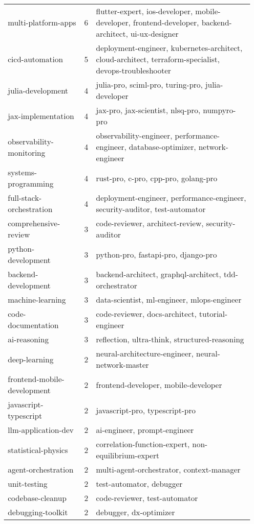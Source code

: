 \documentclass[11pt,a4paper]{article}
\begin{document}
\begin{longtable}{>{\ttfamily}p{} c >{\raggedright\arraybackslash}p{}}
multi-platform-apps & 6 & flutter-expert, ios-developer, mobile-developer, frontend-developer, backend-architect, ui-ux-designer \\
cicd-automation & 5 & deployment-engineer, kubernetes-architect, cloud-architect, terraform-specialist, devops-troubleshooter \\
julia-development & 4 & julia-pro, sciml-pro, turing-pro, julia-developer \\
jax-implementation & 4 & jax-pro, jax-scientist, nlsq-pro, numpyro-pro \\
observability-monitoring & 4 & observability-engineer, performance-engineer, database-optimizer, network-engineer \\
systems-programming & 4 & rust-pro, c-pro, cpp-pro, golang-pro \\
full-stack-orchestration & 4 & deployment-engineer, performance-engineer, security-auditor, test-automator \\
comprehensive-review & 3 & code-reviewer, architect-review, security-auditor \\
python-development & 3 & python-pro, fastapi-pro, django-pro \\
backend-development & 3 & backend-architect, graphql-architect, tdd-orchestrator \\
machine-learning & 3 & data-scientist, ml-engineer, mlops-engineer \\
code-documentation & 3 & code-reviewer, docs-architect, tutorial-engineer \\
ai-reasoning & 3 & reflection, ultra-think, structured-reasoning \\
deep-learning & 2 & neural-architecture-engineer, neural-network-master \\
frontend-mobile-development & 2 & frontend-developer, mobile-developer \\
javascript-typescript & 2 & javascript-pro, typescript-pro \\
llm-application-dev & 2 & ai-engineer, prompt-engineer \\
statistical-physics & 2 & correlation-function-expert, non-equilibrium-expert \\
agent-orchestration & 2 & multi-agent-orchestrator, context-manager \\
unit-testing & 2 & test-automator, debugger \\
codebase-cleanup & 2 & code-reviewer, test-automator \\
debugging-toolkit & 2 & debugger, dx-optimizer \\

\end{longtable}
\end{document}
